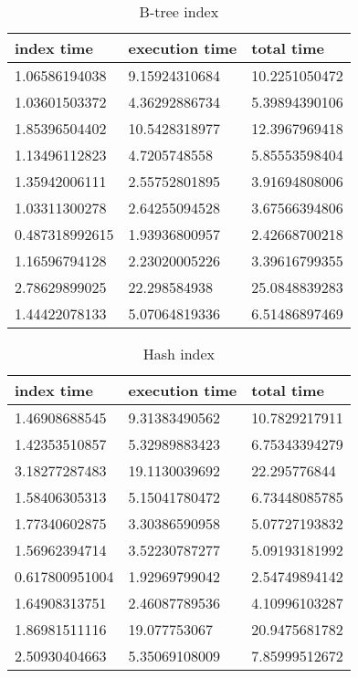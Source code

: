 \begin{itemize*}
\begin{table}[H]
\begin{center}
\begin{tabular}{|l|l|l|}
\hline
index time & execution time & total time                \\ \hline
1.06586194038  & 9.15924310684 & 10.2251050472 \\ \hline
1.03601503372  & 4.36292886734 & 5.39894390106 \\ \hline
1.85396504402  & 10.5428318977 & 12.3967969418 \\ \hline
1.13496112823  & 4.7205748558  & 5.85553598404 \\ \hline
1.35942006111  & 2.55752801895 & 3.91694808006 \\ \hline
1.03311300278  & 2.64255094528 & 3.67566394806 \\ \hline
0.487318992615 & 1.93936800957 & 2.42668700218 \\ \hline
1.16596794128  & 2.23020005226 & 3.39616799355 \\ \hline
2.78629899025  & 22.298584938  & 25.0848839283 \\ \hline
1.44422078133  & 5.07064819336 & 6.51486897469 \\ \hline
\end{tabular}
\end{center}
\caption{B-tree index}
\end{table}

\begin{table}[H]
\begin{center}
\begin{tabular}{|l|l|l|}
\hline
index time & execution time & total time     \\ \hline
1.46908688545  & 9.31383490562 & 10.7829217911 \\ \hline
1.42353510857  & 5.32989883423 & 6.75343394279 \\ \hline
3.18277287483  & 19.1130039692 & 22.295776844  \\ \hline
1.58406305313  & 5.15041780472 & 6.73448085785 \\ \hline
1.77340602875  & 3.30386590958 & 5.07727193832 \\ \hline
1.56962394714  & 3.52230787277 & 5.09193181992 \\ \hline
0.617800951004 & 1.92969799042 & 2.54749894142 \\ \hline
1.64908313751  & 2.46087789536 & 4.10996103287 \\ \hline
1.86981511116  & 19.077753067  & 20.9475681782 \\ \hline
2.50930404663  & 5.35069108009 & 7.85999512672 \\ \hline
\end{tabular}
\end{center}
\caption{Hash index}
\end{table}


\end{itemize*}
